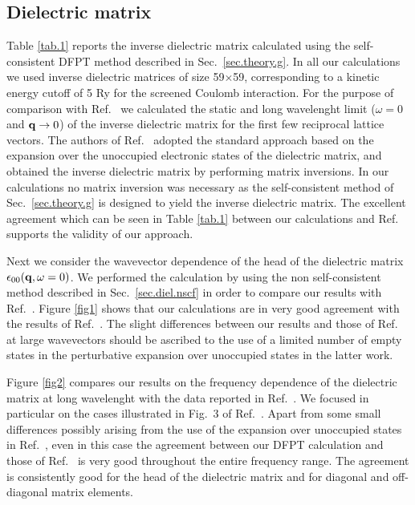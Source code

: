 \documentclass[twocolumn,prb,showpacs,superscriptaddress]{revtex4}
\def\w{\omega}
\def\q{{\bf q}}
\begin{document}
\subsection{Dielectric matrix}\label{sec.5a}

Table \ref{tab.1} reports the inverse dielectric matrix calculated using
the self-consistent DFPT method described in Sec.~\ref{sec.theory.g}.
In all our calculations we used inverse dielectric matrices of size 59$\times$59, 
corresponding to a kinetic energy cutoff of 5 Ry for the screened Coulomb interaction.
For the purpose of comparison with Ref.\  
we calculated the static and long wavelenght limit ($\w=0$ and $\q \rightarrow 0$) of the inverse dielectric matrix
for the first few reciprocal lattice vectors. 
The authors of Ref.\  adopted the standard approach based 
on the expansion over the unoccupied electronic states of the dielectric matrix, 
and obtained the inverse dielectric matrix by performing matrix inversions.
In our calculations no matrix inversion was necessary as the self-consistent method 
of Sec.~\ref{sec.theory.g} is designed to yield the inverse dielectric matrix.
The excellent agreement which can be seen in Table \ref{tab.1} between 
our calculations and Ref.~ supports the validity of our approach.

Next we consider the wavevector dependence of the head of the
dielectric matrix $\epsilon_{00}(\q,\w=0)$. We performed the
calculation by using the non self-consistent method described in
Sec.\ \ref{sec.diel.nscf} in order to compare our results with Ref.\ .
Figure \ref{fig1} shows that our calculations are in very good agreement with the results
of Ref.\ . The slight differences between our results and those
of Ref.\  at large wavevectors should be ascribed to the use of a limited 
number of empty states in the perturbative expansion over unoccupied states in the latter work.

Figure \ref{fig2} compares our results on the frequency dependence of the dielectric matrix
at long wavelenght with the data reported in Ref.\ . 
We focused in particular on the cases illustrated in Fig.\ 3 of Ref.\ .
Apart from some small differences possibly arising from the use of the expansion over unoccupied
states in Ref.\ , even in this case the agreement between our DFPT calculation 
and those of Ref.\  is very good throughout the entire frequency range.
The agreement is consistently good for the head of the dielectric matrix and for
diagonal and off-diagonal matrix elements.
\end{document}
